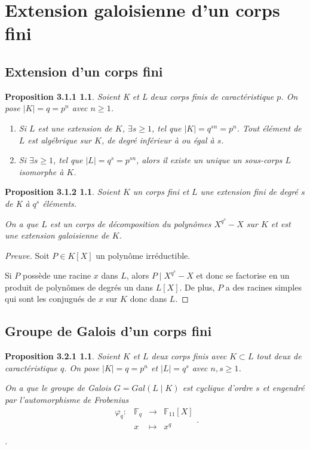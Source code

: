 ﻿\chapter{Extension galoisienne d'un corps fini}
\label{Extension galoisienne d'un corps fini}

\section{Extension d'un corps fini}
\label{Extension d'un corps fini}

\newtheorem*{prop4}{Proposition 3.1.1}
\begin{prop4}
	Soient K et L deux corps finis de caractéristique $p$. On pose $\mid K\mid=q=p^{n}$ avec $n\geq1$.
	\begin{enumerate}
		\item Si $L$ est une extension de $K$, $\exists s\geq1$, tel que $\mid K\mid=q^{sn}=p^{n}$.
					Tout élément de $L$ est algébrique sur $K$, de degré inférieur à ou égal à $s$.
		\item Si $\exists s\geq1$, tel que $\mid L\mid=q^{s}=p^{sn}$, alors il existe un unique un sous-corps $L$ isomorphe à $K$.
	\end{enumerate}
\end{prop4}

\newtheorem*{prop5}{Proposition 3.1.2}
\begin{prop5}
	Soient $K$ un corps fini et $L$ une extension fini de degré $s$ de K à $q^{s}$ éléments.

	On a que $L$ est un corps de décomposition du polynômes $X^{q^{s}}-X$ sur $K$ et est une extension galoisienne de $K$.
\end{prop5}
\begin{proof}[Preuve]
	Soit $P\in K[X]$ un polynôme irréductible.

	Si $P$ possède une racine $x$ dans $L$, alors $P\mid X^{q^{s}}-X$ et donc se factorise en un produit de polynômes de degrés un dans $L[X]$.
	De plus, $P$ a des racines simples qui sont les conjugués de $x$ sur $K$ donc dans $L$.
	\end{proof}

\section{Groupe de Galois d'un corps fini}
\label{Groupe de Galois d'un corps fini}

\newtheorem*{prop6}{Proposition 3.2.1}
\begin{prop6}
	Soient $K$ et $L$ deux corps finis avec $K\subset L$ tout deux de caractéristique $q$. On pose $\left|K\right|=q=p^{n}$ et $\left|L\right|=q^{s}$ avec $n,s\geq1$.

	On a que le groupe de Galois $G=Gal(L\mid K)$ est cyclique d'ordre $s$ et engendré par l'automorphisme de Frobenius 
$$\begin{array}{clcl}
	\varphi_{q} : &\mathbb{F}_{q} &\longrightarrow &\mathbb{F}_{11}[X]\\
								& x 						&\longmapsto		 &x^{q}\\
\end{array}.$$.
\end{prop6}

